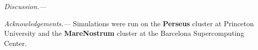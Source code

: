 \documentclass[prl,twocolumn,superscriptaddress]{revtex4-1}
\newcommand{\PRLsection}[1]{\emph{#1.---}}
\begin{document}
\medskip

\PRLsection{Discussion}

\medskip

\PRLsection{Acknowledgements}
Simulations were run on the {\bf Perseus} cluster at Princeton University and the {\bf MareNostrum}
cluster at the Barcelona Supercomputing Center.

\medskip

%

\end{document}
